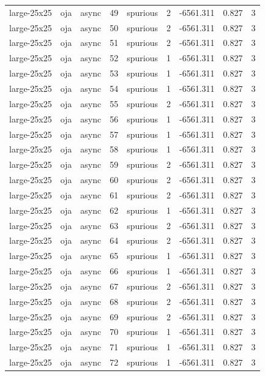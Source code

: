 \begin{tabular}{lllrlrrrr}
large-25x25 & oja & async & 49 & spurious & 2 & -6561.311 & 0.827 & 3 \\
large-25x25 & oja & async & 50 & spurious & 2 & -6561.311 & 0.827 & 3 \\
large-25x25 & oja & async & 51 & spurious & 2 & -6561.311 & 0.827 & 3 \\
large-25x25 & oja & async & 52 & spurious & 1 & -6561.311 & 0.827 & 3 \\
large-25x25 & oja & async & 53 & spurious & 1 & -6561.311 & 0.827 & 3 \\
large-25x25 & oja & async & 54 & spurious & 1 & -6561.311 & 0.827 & 3 \\
large-25x25 & oja & async & 55 & spurious & 2 & -6561.311 & 0.827 & 3 \\
large-25x25 & oja & async & 56 & spurious & 1 & -6561.311 & 0.827 & 3 \\
large-25x25 & oja & async & 57 & spurious & 1 & -6561.311 & 0.827 & 3 \\
large-25x25 & oja & async & 58 & spurious & 1 & -6561.311 & 0.827 & 3 \\
large-25x25 & oja & async & 59 & spurious & 2 & -6561.311 & 0.827 & 3 \\
large-25x25 & oja & async & 60 & spurious & 2 & -6561.311 & 0.827 & 3 \\
large-25x25 & oja & async & 61 & spurious & 2 & -6561.311 & 0.827 & 3 \\
large-25x25 & oja & async & 62 & spurious & 1 & -6561.311 & 0.827 & 3 \\
large-25x25 & oja & async & 63 & spurious & 2 & -6561.311 & 0.827 & 3 \\
large-25x25 & oja & async & 64 & spurious & 2 & -6561.311 & 0.827 & 3 \\
large-25x25 & oja & async & 65 & spurious & 1 & -6561.311 & 0.827 & 3 \\
large-25x25 & oja & async & 66 & spurious & 1 & -6561.311 & 0.827 & 3 \\
large-25x25 & oja & async & 67 & spurious & 2 & -6561.311 & 0.827 & 3 \\
large-25x25 & oja & async & 68 & spurious & 2 & -6561.311 & 0.827 & 3 \\
large-25x25 & oja & async & 69 & spurious & 2 & -6561.311 & 0.827 & 3 \\
large-25x25 & oja & async & 70 & spurious & 1 & -6561.311 & 0.827 & 3 \\
large-25x25 & oja & async & 71 & spurious & 1 & -6561.311 & 0.827 & 3 \\
large-25x25 & oja & async & 72 & spurious & 1 & -6561.311 & 0.827 & 3 \\

\end{tabular}
